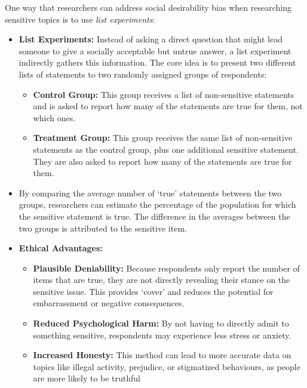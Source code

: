 \documentclass{article}
\begin{document}
    \noindent One way that researchers can address social desirability bias
when researching sensitive topics is to use \textit{list experiments}:
    \begin{itemize}
        \item \textbf{List Experiments:} Instead of asking a direct question
        that might lead someone to give a socially acceptable but untrue
        answer, a list experiment indirectly gathers this information. The
        core idea is to present two different lists of statements to two
        randomly assigned groups of respondents:
        \begin{itemize}
            \item \textbf{Control Group:} This group receives a list of
            non-sensitive statements and is asked to report how many of the
            statements are true for them, not which ones.
            \item \textbf{Treatment Group:} This group receives the same
            list of non-sensitive statements as the control group, plus one
            additional sensitive statement. They are also asked to report
            how many of the statements are true for them.
        \end{itemize}
        \item By comparing the average number of `true' statements between
        the two groups, researchers can estimate the percentage of the
        population for which the sensitive statement is true. The difference
        in the averages between the two groups is attributed to the
        sensitive item.
        \item \textbf{Ethical Advantages:}
        \begin{itemize}
            \item \textbf{Plausible Deniability:} Because respondents only
            report the number of items that are true, they are not directly
            revealing their stance on the sensitive issue. This provides
            `cover' and reduces the potential for embarrassment or negative
            consequences.
            \item \textbf{Reduced Psychological Harm:} By not having to
            directly admit to something sensitive, respondents may
            experience less stress or anxiety.
            \item \textbf{Increased Honesty:} This method can lead to more
            accurate data on topics like illegal activity, prejudice, or
            stigmatized behaviours, as people are more likely to be truthful

\end{itemize}
\end{itemize}
\end{document}
